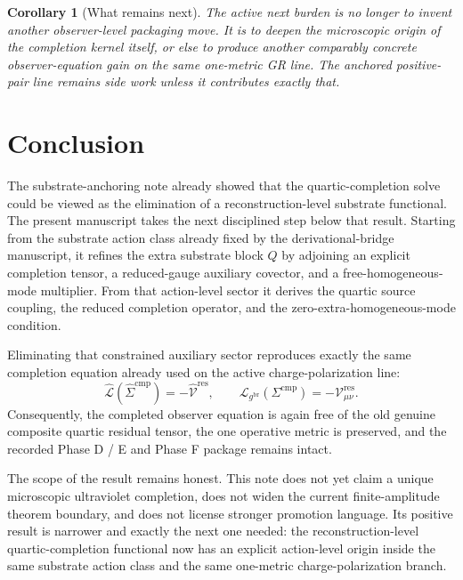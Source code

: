\documentclass[11pt]{article}
\newcommand{\ObserverMetric}{g^{\mathrm{br}}}
\newcommand{\CompShift}{\Sigma^{\mathrm{cmp}}}
\newcommand{\CompLift}{\widehat\Sigma^{\mathrm{cmp}}}
\newcommand{\ResidualCore}{\mathcal V_{\mu\nu}^{\mathrm{res}}}
\newcommand{\ResidualLift}{\widehat{\mathcal V}^{\mathrm{res}}}
\newcommand{\SubReducedEin}{\widehat{\mathcal L}}
\newcommand{\ReducedEin}{\mathcal L_{\ObserverMetric}}
\newtheorem{corollary}{Corollary}
\begin{document}
\begin{corollary}[What remains next]
The active next burden is no longer to invent another observer-level packaging move. It is to deepen the microscopic origin of the completion kernel itself, or else to produce another comparably concrete observer-equation gain on the same one-metric GR line. The anchored positive-pair line remains side work unless it contributes exactly that.
\end{corollary}

\section{Conclusion}

The substrate-anchoring note already showed that the quartic-completion solve could be viewed as the elimination of a reconstruction-level substrate functional. The present manuscript takes the next disciplined step below that result. Starting from the substrate action class already fixed by the derivational-bridge manuscript, it refines the extra substrate block \(Q\) by adjoining an explicit completion tensor, a reduced-gauge auxiliary covector, and a free-homogeneous-mode multiplier. From that action-level sector it derives the quartic source coupling, the reduced completion operator, and the zero-extra-homogeneous-mode condition.

Eliminating that constrained auxiliary sector reproduces exactly the same completion equation already used on the active charge-polarization line:
\[
\SubReducedEin(\CompLift)=-\ResidualLift,
\qquad
\ReducedEin(\CompShift)=-\ResidualCore.
\]
Consequently, the completed observer equation is again free of the old genuine composite quartic residual tensor, the one operative metric is preserved, and the recorded Phase D / E and Phase F package remains intact.

The scope of the result remains honest. This note does not yet claim a unique microscopic ultraviolet completion, does not widen the current finite-amplitude theorem boundary, and does not license stronger promotion language. Its positive result is narrower and exactly the next one needed: the reconstruction-level quartic-completion functional now has an explicit action-level origin inside the same substrate action class and the same one-metric charge-polarization branch.
\end{document}
